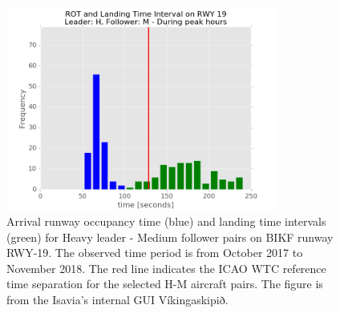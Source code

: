 \begin{figure}[h]
    \centering
    \includegraphics[width=0.8\textwidth]{graphics/fig_rot_landig_time_interval_RWY19_leader_H_follower_M_peak-hour_BAR_20171004_20181130.png}
    \caption[AROT and LTI of H-M pairs on RWY~19]{Arrival runway occupancy time (blue) and landing time intervals (green) for Heavy leader - Medium follower pairs on BIKF runway RWY-19. The observed time period is from October 2017 to November 2018. The red line indicates the ICAO WTC reference time separation for the selected H-M aircraft pairs. The figure is from the Isavia's internal GUI Víkingaskipið.}\label{fig:AROT_LTI_rwy19_H_M}
\end{figure}




